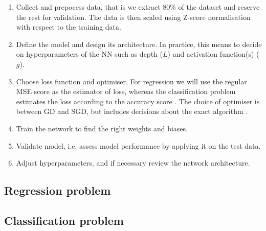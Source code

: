     \begin{enumerate}[label=(\roman*)]
        \item\label{item:build1} Collect and prepocess data, that is we extract 80\% of the dataset and reserve the rest for validation. The data is then scaled using Z-score  normalisation with respect to the training data.
        \item\label{item:build2} Define the model and design its architecture. In practice, this means to decide on hyperparameters of the NN such as depth ($L$) and activation function(s) ($g$).
        \item\label{item:build3} Choose loss function and optimiser. For regression we will use the regular MSE score  as the estimator of loss, whereas the classification problem estimates the loss according to the accuracy score .  The choice of optimiser is between GD and SGD, but includes decisions about the exact algorithm .
        \item\label{item:solve1} Train the network to find the right weights and biases.
        \item\label{item:solve2} Validate model, i.e. assess model performance by applying it on the test data.
        \item\label{item:solve3} Adjust hyperparameters, and if necessary review the network architecture.
    \end{enumerate}

    

\subsection{Regression problem}\label{sec:analysis_regression}





\subsection{Classification problem}\label{sec:analysis_classification}

